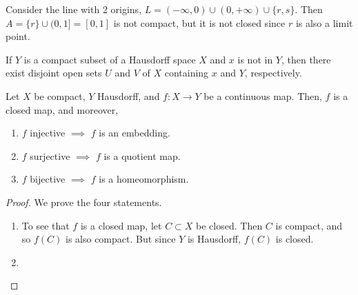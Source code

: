   \begin{example}
    Consider the line with 2 origins, $L = (-\infty, 0) \cup (0, +\infty) \cup \{r, s\}$. Then $A = \{r\} \cup (0, 1] = [0, 1]$ is not compact, but it is not closed since $r$ is also a limit point. 
  \end{example}

  \begin{lemma}
    If $Y$ is a compact subset of a Hausdorff space $X$ and $x$ is not in $Y$, then there exist disjoint open sets $U$ and $V$ of $X$ containing $x$ and $Y$, respectively. 

    \begin{figure}[H]
      \centering 
      \label{fig:hausdorff_compact}
    \end{figure}
  \end{lemma}

  \begin{theorem}
    Let $X$ be compact, $Y$ Hausdorff, and $f: X \to Y$ be a continuous map. Then, $f$ is a closed map, and moreover, 
    \begin{enumerate}
      \item $f$ injective $\implies$ $f$ is an embedding. 
      \item $f$ surjective $\implies$ $f$ is a quotient map. 
      \item $f$ bijective $\implies$ $f$ is a homeomorphism. 
    \end{enumerate}
  \end{theorem}
  \begin{proof} 
    We prove the four statements. 
    \begin{enumerate}
      \item To see that $f$ is a closed map, let $C \subset X$ be closed. Then $C$ is compact, and so $f(C)$ is also compact. But since $Y$ is Hausdorff, $f(C)$ is closed. 
      \item 
    \end{enumerate}
  \end{proof}

